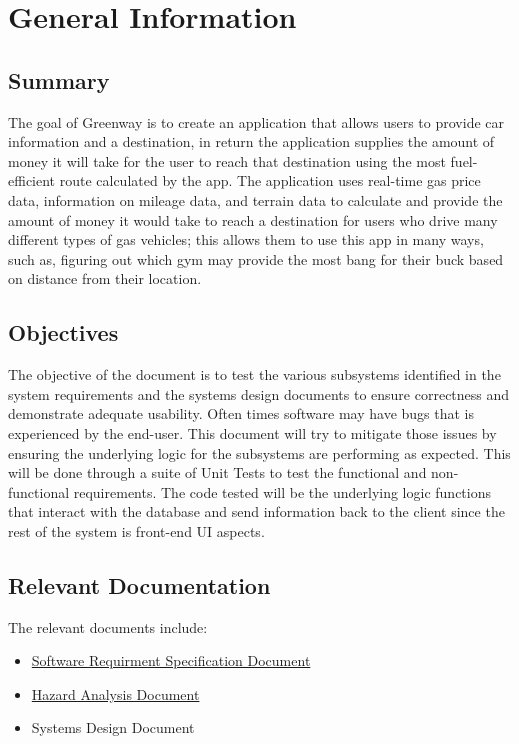 \documentclass[12pt, titlepage]{article}
\begin{document}
\section{General Information}

\subsection{Summary}


The goal of Greenway is to create an application that allows users to provide car information
and a destination, in return the application supplies the amount of money it will take for
the user to reach that destination using the most fuel-efficient route calculated by the app.
The application uses real-time gas price data, information on mileage data, and terrain data
to calculate and provide the amount of money it would take to reach a destination for users
who drive many different types of gas vehicles; this allows them to use this app in many
ways, such as, figuring out which gym may provide the most bang for their buck based on
distance from their location.

\subsection{Objectives}

The objective of the document is to test the various subsystems identified in the system requirements and the systems design documents to ensure correctness and demonstrate adequate usability. 
Often times software may have
bugs that is experienced by the end-user. This document will try to mitigate those issues by
ensuring the underlying logic for the subsystems are performing as expected. This will be
done through a suite of Unit Tests to test the functional and non-functional requirements.
The code tested will be the underlying logic functions that interact with the database and
send information back to the client since the rest of the system is front-end UI aspects.


\subsection{Relevant Documentation}


The relevant documents include:
\begin{itemize}
\item \href{https://github.com/mehtaj8/Greenway/blob/main/docs/SRS/SRS.pdf}{Software Requirment Specification Document}
\item \href{https://github.com/mehtaj8/Greenway/blob/main/docs/HazardAnalysis/HazardAnalysis.pdf}{Hazard Analysis Document}
\item Systems Design Document
\end{itemize}
\end{document}
